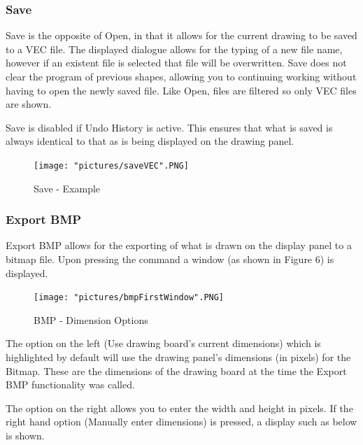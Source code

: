 \documentclass[12pt]{article} %
\begin{document}
\subsubsection{Save}
Save is the opposite of Open, in that it allows for the current drawing to be saved to a VEC file. The displayed dialogue allows for the typing of a new file name, however if an existent file is selected that file will be overwritten. Save does not clear the program of previous shapes, allowing you to continuing working without having to open the newly saved file. Like Open, files are filtered so only VEC files are shown. 

Save is disabled if Undo History is active. This ensures that what is saved is always identical to that as is being displayed on the drawing panel.

\begin{figure}[hbtp]
\caption{Save - Example}
\centering
\texttt{[image: "pictures/saveVEC".PNG]}
\end{figure}

\subsubsection{Export BMP}
Export BMP allows for the exporting of what is drawn on the display panel to a bitmap file. Upon pressing the command a window (as shown in Figure 6) is displayed.

\begin{figure}[hbtp]
\caption{BMP - Dimension Options}
\centering
\texttt{[image: "pictures/bmpFirstWindow".PNG]}
\end{figure}

The option on the left (Use drawing board's current dimensions) which is highlighted by default will use the drawing panel's dimensions (in pixels) for the Bitmap. These are the dimensions of the drawing board at the time the Export BMP functionality was called.

The option on the right allows you to enter the width and height in pixels. If the right hand option (Manually enter dimensions) is pressed, a display such as below is shown.
\end{document}
